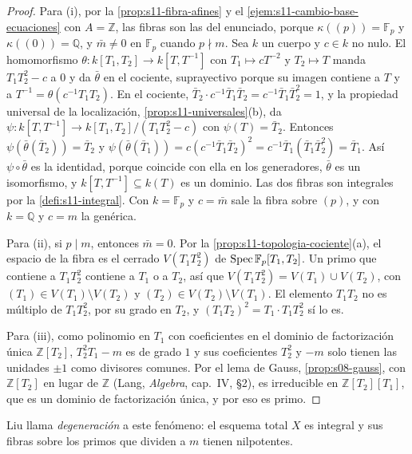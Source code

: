 \begin{proof}
Para (i), por la \cref{prop:s11-fibra-afines} y el \cref{ejem:s11-cambio-base-ecuaciones} con \(A=\mathbb Z\), las fibras son las del enunciado, porque \(\kappa((p))=\mathbb F_p\) y \(\kappa((0))=\mathbb Q\), y \(\bar m\ne0\) en \(\mathbb F_p\) cuando \(p\nmid m\). Sea \(k\) un cuerpo y \(c\in k\) no nulo. El homomorfismo \(\theta\colon k[T_1,T_2]\to k[T,T^{-1}]\) con \(T_1\mapsto cT^{-2}\) y \(T_2\mapsto T\) manda \(T_1T_2^2-c\) a \(0\) y da \(\bar\theta\) en el cociente, suprayectivo porque su imagen contiene a \(T\) y a \(T^{-1}=\theta(c^{-1}T_1T_2)\). En el cociente, \(\bar T_2\cdot c^{-1}\bar T_1\bar T_2=c^{-1}\bar T_1\bar T_2^2=1\), y la propiedad universal de la localización, \cref{prop:s11-universales}(b), da \(\psi\colon k[T,T^{-1}]\to k[T_1,T_2]/(T_1T_2^2-c)\) con \(\psi(T)=\bar T_2\). Entonces \(\psi(\bar\theta(\bar T_2))=\bar T_2\) y \(\psi(\bar\theta(\bar T_1))=c(c^{-1}\bar T_1\bar T_2)^2=c^{-1}\bar T_1(\bar T_1\bar T_2^2)=\bar T_1\). Así \(\psi\circ\bar\theta\) es la identidad, porque coincide con ella en los generadores, \(\bar\theta\) es un isomorfismo, y \(k[T,T^{-1}]\subseteq k(T)\) es un dominio. Las dos fibras son integrales por la \cref{defi:s11-integral}. Con \(k=\mathbb F_p\) y \(c=\bar m\) sale la fibra sobre \((p)\), y con \(k=\mathbb Q\) y \(c=m\) la genérica.

Para (ii), si \(p\mid m\), entonces \(\bar m=0\). Por la \cref{prop:s11-topologia-cociente}(a), el espacio de la fibra es el cerrado \(V(T_1T_2^2)\) de \(\operatorname{Spec}\mathbb F_p[T_1,T_2]\). Un primo que contiene a \(T_1T_2^2\) contiene a \(T_1\) o a \(T_2\), así que \(V(T_1T_2^2)=V(T_1)\cup V(T_2)\), con \((T_1)\in V(T_1)\setminus V(T_2)\) y \((T_2)\in V(T_2)\setminus V(T_1)\). El elemento \(T_1T_2\) no es múltiplo de \(T_1T_2^2\), por su grado en \(T_2\), y \((T_1T_2)^2=T_1\cdot T_1T_2^2\) sí lo es.

Para (iii), como polinomio en \(T_1\) con coeficientes en el dominio de factorización única \(\mathbb Z[T_2]\), \(T_2^2T_1-m\) es de grado \(1\) y sus coeficientes \(T_2^2\) y \(-m\) solo tienen las unidades \(\pm1\) como divisores comunes. Por el lema de Gauss, \cref{prop:s08-gauss}, con \(\mathbb Z[T_2]\) en lugar de \(\mathbb Z\) (Lang, \emph{Algebra}, cap.~IV, \S2), es irreducible en \(\mathbb Z[T_2][T_1]\), que es un dominio de factorización única, y por eso es primo.
\end{proof}

Liu llama \emph{degeneración} a este fenómeno: el esquema total \(X\) es integral y sus fibras sobre los primos que dividen a \(m\) tienen nilpotentes.

